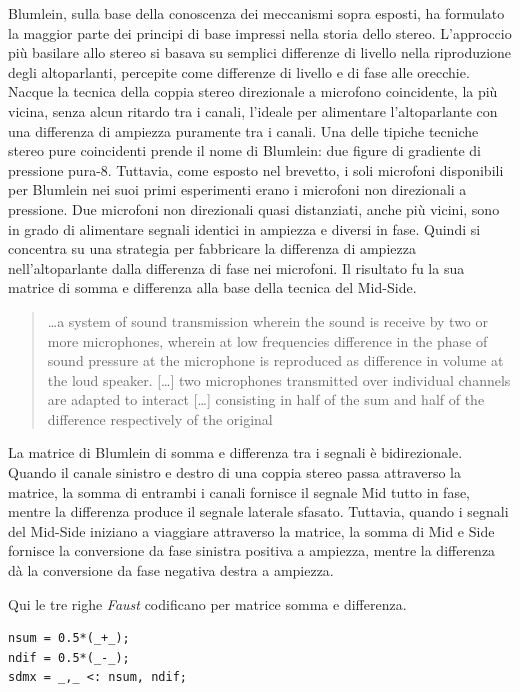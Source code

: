 Blumlein, sulla base della conoscenza dei meccanismi sopra esposti, ha formulato
la maggior parte dei principi di base impressi nella storia dello stereo.
L'approccio più basilare allo stereo si basava su semplici differenze di livello
nella riproduzione degli altoparlanti, percepite come differenze di livello e di
fase alle orecchie. Nacque la tecnica della coppia stereo direzionale a
microfono coincidente, la più vicina, senza alcun ritardo tra i canali,
l'ideale per alimentare l'altoparlante con una differenza di ampiezza puramente
tra i canali. Una delle tipiche tecniche stereo pure coincidenti prende il nome
di Blumlein: due figure di gradiente di pressione pura-8. Tuttavia, come esposto
nel brevetto, i soli microfoni disponibili per Blumlein nei suoi primi
esperimenti erano i microfoni non direzionali a pressione. Due microfoni non
direzionali quasi distanziati, anche più vicini, sono in grado di alimentare
segnali identici in ampiezza e diversi in fase. Quindi si concentra su una
strategia per fabbricare la differenza di ampiezza nell'altoparlante dalla
differenza di fase nei microfoni. Il risultato fu la sua matrice di somma e
differenza alla base della tecnica del Mid-Side.

\begin{quotation}
\ldots a system of sound transmission wherein the sound
is receive by two or more microphones, wherein at low frequencies difference in
the phase of sound pressure at the microphone is reproduced as difference in
volume at the loud speaker. [\ldots] two microphones transmitted over individual
channels are adapted to interact [\ldots] consisting in half of the sum and half
of the difference respectively of the original \cite{ab58}
\end{quotation}

La matrice di Blumlein di somma e differenza tra i segnali è bidirezionale.
Quando il canale sinistro e destro di una coppia stereo passa attraverso la
matrice, la somma di entrambi i canali fornisce il segnale Mid tutto in fase,
mentre la differenza produce il segnale laterale sfasato. Tuttavia, quando i
segnali del Mid-Side iniziano a viaggiare attraverso la matrice, la somma di Mid
e Side fornisce la conversione da fase sinistra positiva a ampiezza, mentre la
differenza dà la conversione da fase negativa destra a ampiezza.

Qui le tre righe \emph{Faust} codificano per matrice somma e differenza.%

\begin{lstlisting}
nsum = 0.5*(_+_);
ndif = 0.5*(_-_);
sdmx = _,_ <: nsum, ndif;
\end{lstlisting}

